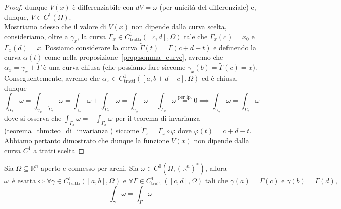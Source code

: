 \begin{proof}
dunque $V(x)$ è differenziabile con $dV = \omega$ (per unicità del differenziale) e, dunque, $V \in C^1(\Omega)$. \\
Mostriamo adesso che il valore di $V(x)$ non dipende dalla curva scelta, consideriamo, oltre a $\gamma_x$, la curva $\Gamma_x \in C^1_\text{tratti}([c, d], \Omega)$ tale che $\Gamma_x(c) = x_0$ e $\Gamma_x(d) = x$. Possiamo considerare la curva $\tilde{\Gamma}(t) = \Gamma(c + d - t)$ e definendo la curva $\alpha(t)$ come nella proposizione~\ref{prop:somma_curve}, avremo che $\alpha_x = \gamma_x + \tilde{\Gamma}$ è una curva chiusa (che possiamo fare
siccome $\gamma_x(b) = \tilde{\Gamma}(c) = x$). \\
Conseguentemente, avremo che $\alpha_x \in C^1_\text{tratti}([a, b+d-c], \Omega)$ ed è chiusa, dunque
$$
\int_{\alpha_x} \omega = \int_{\gamma_x + \tilde{\Gamma}_x} \omega = \int_{\gamma_x} \omega + \int_{\tilde{\Gamma}_x} \omega = \int_{\gamma_x} \omega - \int_{\Gamma_x} \omega \stackrel{\text{per ip.}}{=} 0 \implies \int_{\gamma_x} \omega= \int_{\Gamma_x} \omega
$$
dove si osserva che $\int_{\tilde{\Gamma}_x} \omega = - \int_{\Gamma_x} \omega$ per il teorema di invarianza (teorema~\ref{thm:teo_di_invarianza}) siccome $\tilde{\Gamma}_x = \Gamma_x \circ \varphi$ dove $\varphi(t) = c + d - t$. Abbiamo pertanto dimostrato che dunque la funzione $V(x)$ non dipende dalla curva $C^1$ a tratti scelta
\end{proof}
\begin{theorem}[CF2]
	Sia $\Omega \subseteq \mathbb{R}^n$ aperto e connesso per archi. Sia $\omega \in C^0(\Omega, (\mathbb{R}^n)^*)$, allora $\omega \, \text{ è esatta} \iff \forall \gamma \in C^1_\text{tratti}([a,b], \Omega) \text{ e } \forall \Gamma \in C^1_\text{tratti}([c,d], \Omega) \text{ tali che } \gamma(a) = \Gamma(c) \text{ e } \gamma(b) = \Gamma(d), $
	$$ 
	\int_\gamma \omega = \int_\Gamma \omega
	$$
\end{theorem}
